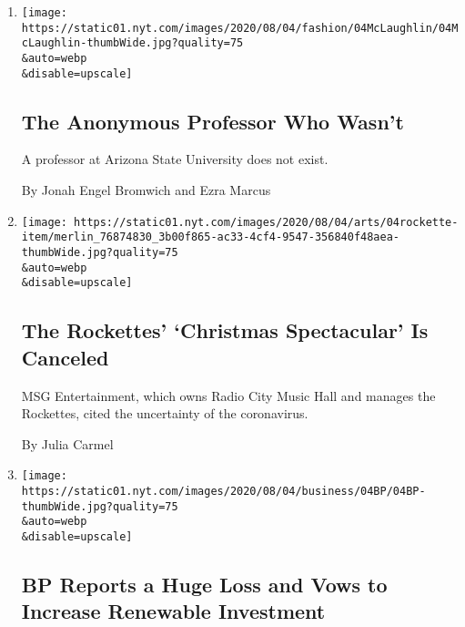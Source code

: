 \begin{enumerate}
\def\labelenumi{\arabic{enumi}.}
\item
  \href{/2020/08/04/style/college-coronavirus-hoax.html}{}

  \texttt{[image: https://static01.nyt.com/images/2020/08/04/fashion/04McLaughlin/04McLaughlin-thumbWide.jpg?quality=75\\\&auto=webp\\\&disable=upscale]}

  \hypertarget{the-anonymous-professor-who-wasnt}{%
  \subsection{The Anonymous Professor Who
  Wasn't}\label{the-anonymous-professor-who-wasnt}}

  A professor at Arizona State University does not exist.

  By Jonah Engel Bromwich and Ezra Marcus
\item
  \href{/2020/08/04/theater/radio-city-rockettes-christmas-canceled.html}{}

  \texttt{[image: https://static01.nyt.com/images/2020/08/04/arts/04rockette-item/merlin\_76874830\_3b00f865-ac33-4cf4-9547-356840f48aea-thumbWide.jpg?quality=75\\\&auto=webp\\\&disable=upscale]}

  \hypertarget{the-rockettes-christmas-spectacular-is-canceled}{%
  \subsection{The Rockettes' `Christmas Spectacular' Is
  Canceled}\label{the-rockettes-christmas-spectacular-is-canceled}}

  MSG Entertainment, which owns Radio City Music Hall and manages the
  Rockettes, cited the uncertainty of the coronavirus.

  By Julia Carmel
\item
  \href{/2020/08/04/business/energy-environment/bp-renewable-investment.html}{}

  \texttt{[image: https://static01.nyt.com/images/2020/08/04/business/04BP/04BP-thumbWide.jpg?quality=75\\\&auto=webp\\\&disable=upscale]}

  \hypertarget{bp-reports-a-huge-loss-and-vows-to-increase-renewable-investment}{%
  \subsection{BP Reports a Huge Loss and Vows to Increase Renewable
  Investment}\label{bp-reports-a-huge-loss-and-vows-to-increase-renewable-investment}}


\end{enumerate}
